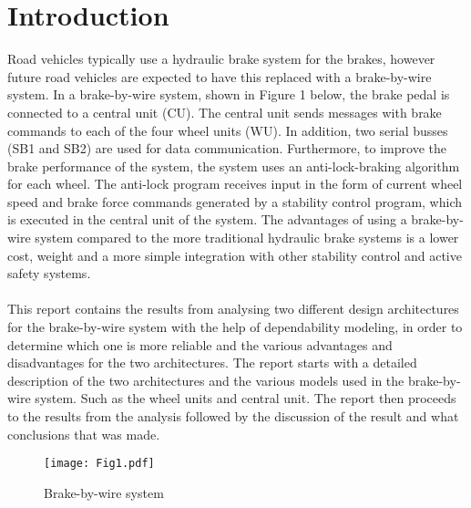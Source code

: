 \newpage
\section{Introduction}
Road vehicles typically use a hydraulic brake system for the brakes, however future road vehicles are expected to have this replaced with a brake-by-wire system. In a brake-by-wire system, shown in Figure 1 below, the brake pedal is connected to a central unit (CU). The central unit sends messages with brake commands to each of the four wheel units (WU). In addition, two serial busses (SB1 and SB2) are used for data communication. Furthermore, to improve the brake performance of the system, the system uses an anti-lock-braking algorithm for each wheel. The anti-lock program receives input in the form of current wheel speed and brake force commands generated by a stability control program, which is executed in the central unit of the system.  The advantages of using a brake-by-wire system compared to the more traditional hydraulic brake systems is a lower cost, weight and a more simple integration with other stability control and active safety systems.\\
\\
This report contains the results from analysing two different design architectures for the brake-by-wire system with the help of dependability modeling, in order to determine which one is more reliable and the various advantages and disadvantages for the two architectures. The report starts with a detailed description of the two architectures and the various models used in the brake-by-wire system. Such as the wheel units and central unit. The report then proceeds to the results from the analysis followed by the discussion of the result and what conclusions that was made.

\begin{figure}[h!]
  \centering
  \texttt{[image: Fig1.pdf]}
  \caption{Brake-by-wire system}
  \label{fig1}
\end{figure}
